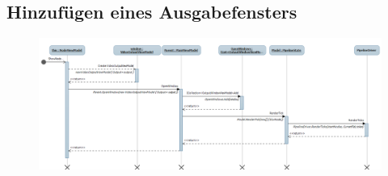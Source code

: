 \subsection{Hinzufügen eines Ausgabefensters}
\begin{figure}[h!]
\begin{center}
\includegraphics[width=0.9\textheight,angle=90]{Diagrams/shownodeoutput.png}
\end{center}
\end{figure}
\newpage

